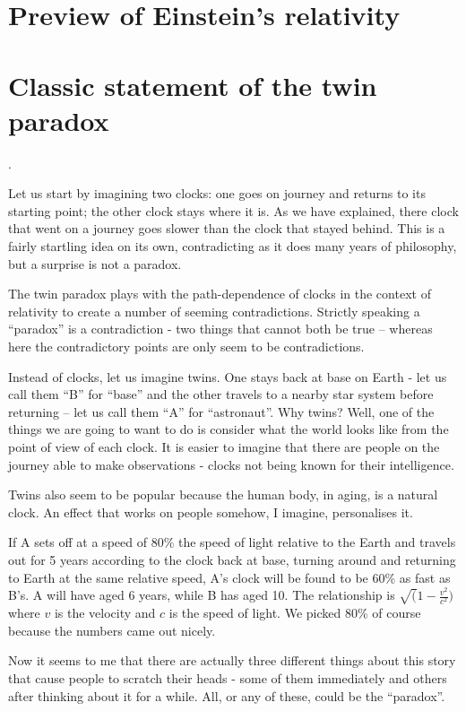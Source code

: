\documentclass[a4paper]{report}
\begin{document}
\section*{Preview of Einstein's relativity}


\section*{Classic statement of the twin paradox}.

Let us start by imagining two clocks: one goes on journey and returns to its starting point; the other clock stays where it is. As we have explained, there clock that went on a journey goes slower than the clock that stayed behind. This is a fairly startling idea on its own, contradicting as it does many years of philosophy, but a surprise is not a paradox.

The twin paradox plays with the path-dependence of clocks in the context of relativity to create a number of seeming contradictions. Strictly speaking a ``paradox'' is a contradiction - two things that cannot both be true -- whereas here the contradictory points are only seem to be contradictions.

Instead of clocks, let us imagine twins. One stays back at base on Earth - let us call them ``B'' for ``base'' and the other travels to a nearby star system before returning -- let us call them ``A'' for ``astronaut''. Why twins? Well, one of the things we are going to want to do is consider what the world looks like from the point of view of each clock. It is easier to imagine that there are people on the journey able to make observations - clocks not being known for their intelligence.

Twins also seem to be popular because the human body, in aging, is a natural clock. An effect that works on people somehow, I imagine, personalises it.

If A sets off at a speed of 80\% the speed of light relative to the Earth and travels out for 5 years according to the clock back at base, turning around and returning to Earth at the same relative speed, A's clock will be found to be 60\% as fast as B's. A will have aged 6 years, while B has aged 10. The relationship is $\sqrt(1 - \frac{v^2}{c^2})$ where $v$ is the velocity and $c$ is the speed of light. We picked 80\% of course because the numbers came out nicely.

Now it seems to me that there are actually three different things about this story that cause people to scratch their heads - some of them immediately and others after thinking about it for a while. All, or any of these, could be the ``paradox''.
\end{document}
